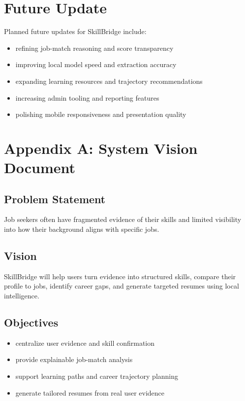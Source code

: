 \documentclass[11pt]{article}
\begin{document}
\section{Future Update}
Planned future updates for SkillBridge include:
\begin{itemize}[leftmargin=1.25em]
  \item refining job-match reasoning and score transparency
  \item improving local model speed and extraction accuracy
  \item expanding learning resources and trajectory recommendations
  \item increasing admin tooling and reporting features
  \item polishing mobile responsiveness and presentation quality
\end{itemize}

\section{Appendix A: System Vision Document}
\subsection{Problem Statement}
Job seekers often have fragmented evidence of their skills and limited visibility into how their background aligns with specific jobs.

\subsection{Vision}
SkillBridge will help users turn evidence into structured skills, compare their profile to jobs, identify career gaps, and generate targeted resumes using local intelligence.

\subsection{Objectives}
\begin{itemize}[leftmargin=1.25em]
  \item centralize user evidence and skill confirmation
  \item provide explainable job-match analysis
  \item support learning paths and career trajectory planning
  \item generate tailored resumes from real user evidence
\end{itemize}
\end{document}
